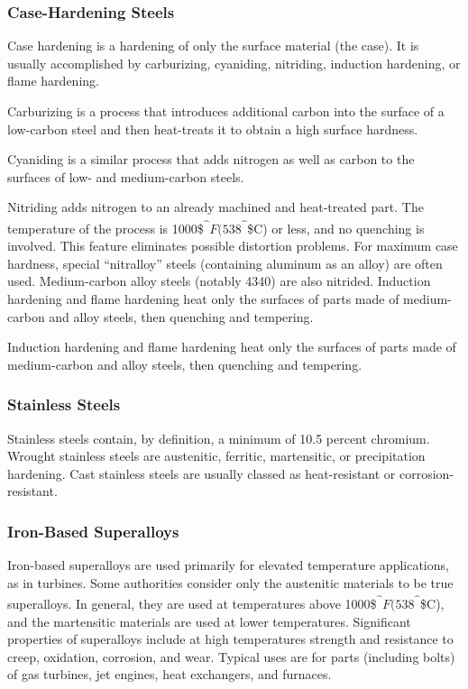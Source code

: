 \documentclass[a4paper,openany,nobib]{tufte-book}
\begin{document}
\subsubsection{Case-Hardening Steels}
\label{case-hardening-steels}
Case hardening is a hardening of only the surface material (the case).
It is usually accomplished by carburizing, cyaniding, nitriding,
induction hardening, or flame hardening.

Carburizing is a process that introduces additional carbon into the
surface of a low-carbon steel and then heat-treats it to obtain a high
surface hardness.

Cyaniding is a similar process that adds nitrogen as well as carbon to
the surfaces of low- and medium-carbon steels.

Nitriding adds nitrogen to an already machined and heat-treated part.
The temperature of the process is 1000\$\textsuperscript{\^{}}\(F (538\)\textsuperscript{\^{}}\$C) or
less, and no quenching is involved. This feature eliminates possible
distortion problems. For maximum case hardness, special ``nitralloy''
steels (containing aluminum as an alloy) are often used. Medium-carbon
alloy steels (notably 4340) are also nitrided. Induction hardening and
flame hardening heat only the surfaces of parts made of medium-carbon
and alloy steels, then quenching and tempering.

Induction hardening and flame hardening heat only the surfaces of parts
made of medium-carbon and alloy steels, then quenching and tempering.

\subsubsection{Stainless Steels}
\label{stainless-steels}
Stainless steels contain, by definition, a minimum of 10.5 percent
chromium. Wrought stainless steels are austenitic, ferritic,
martensitic, or precipitation hardening. Cast stainless steels are
usually classed as heat-resistant or corrosion-resistant.

\subsubsection{Iron-Based Superalloys}
\label{iron-based-superalloys}
Iron-based superalloys are used primarily for elevated temperature
applications, as in turbines. Some authorities consider only the
austenitic materials to be true superalloys. In general, they are used
at temperatures above 1000\$\textsuperscript{\^{}}\(F (538\)\textsuperscript{\^{}}\$C), and the
martensitic materials are used at lower temperatures. Significant
properties of superalloys include at high temperatures strength and
resistance to creep, oxidation, corrosion, and wear. Typical uses are
for parts (including bolts) of gas turbines, jet engines, heat
exchangers, and furnaces.
\end{document}
